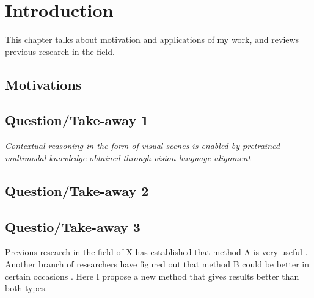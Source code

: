 \chapter{Introduction}
\label{cha:introduction}

This chapter talks about motivation and applications of my work,
and reviews previous research in the field.

\section{Motivations}
\section{Question/Take-away 1}
\textit{Contextual reasoning in the form of visual scenes is enabled by pretrained multimodal knowledge obtained through vision-language alignment}
\section{Question/Take-away 2}
\section{Questio/Take-away 3}
\label{sec:motivations}

Previous research in the field of X has established that method A is very useful
\cite{Fisher:1954,Robbins:1951aa,Knight:1921}.
Another branch of researchers have figured out that method B could be better in certain occasions
\cite{Wright:1921aa,Caratheodory:1909aa,Gibbs:1902,Clausius:1857}.
Here I propose a new method that gives results better than both types.

\Blindtext[1]
